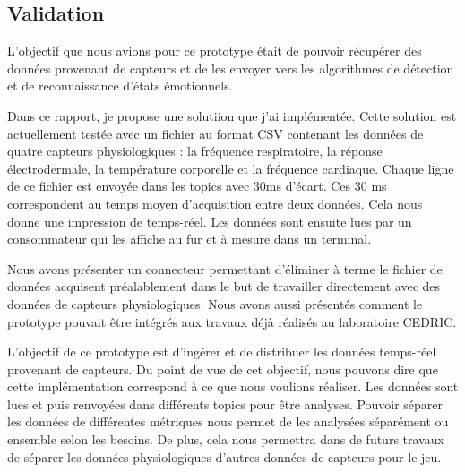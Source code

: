\documentclass[11pt]{article}
\begin{document}
	\subsection{Validation}\label{sec:validation}
		L'objectif que nous avions pour ce prototype était de pouvoir récupérer des données provenant de capteurs et de les envoyer vers les algorithmes de détection et de reconnaissance d'états émotionnels.\par
		Dans ce rapport, je propose une solutiion que j'ai implémentée.
		Cette solution est actuellement testée avec un fichier au format CSV contenant les données de quatre capteurs physiologiques : la fréquence respiratoire, la réponse électrodermale, la température corporelle et la fréquence cardiaque. 
		Chaque ligne de ce fichier est envoyée dans les topics avec 30ms d'écart.
		Ces 30 ms correspondent au temps moyen d'acquisition entre deux données.
		Cela nous donne une impression de temps-réel. 
		Les données sont ensuite lues par un consommateur qui les affiche au fur et à mesure dans un terminal.\par
		Nous avons présenter un connecteur permettant d'éliminer à terme le fichier de données acquisent préalablement dans le but de travailler directement avec des données de capteurs physiologiques.
		Nous avons aussi présentés comment le prototype pouvait être intégrés aux travaux déjà réalisés au laboratoire CEDRIC.\par
		L'objectif de ce prototype est d'ingérer et de distribuer les données temps-réel provenant de capteurs.
		Du point de vue de cet objectif, nous pouvons dire que cette implémentation correspond à ce que nous voulions réaliser.
		Les données sont lues et puis renvoyées dans différents topics pour être analyses.
		Pouvoir séparer les données de différentes métriques nous permet de les analysées séparément ou ensemble selon les besoins.
		De plus, cela nous permettra dans de futurs travaux de séparer les données physiologiques d'autres données de capteurs pour le jeu.\par
\end{document}
